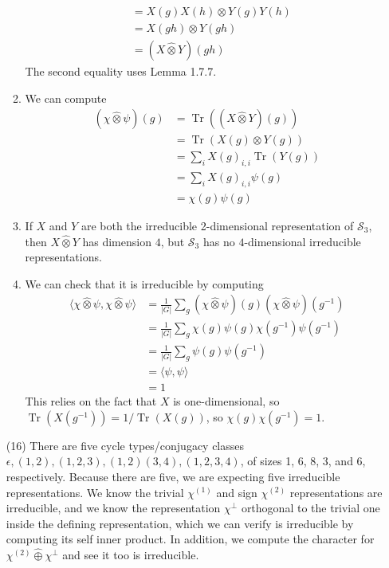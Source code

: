 \documentclass{amsart}
\DeclareMathOperator{\Tr}{Tr}
\renewcommand{\S}{\mathcal{S}}
\begin{document}
\begin{enumerate}
\begin{enumerate}
\begin{align*}
    &= X(g)X(h) \otimes Y(g)Y(h) \\
    & = X(gh) \otimes Y(gh) \\
    &= (X \hat{\otimes} Y)(gh)
    \end{align*}
    The second equality uses Lemma 1.7.7.
    \item We can compute
    \begin{align*}
        (\chi\hat{\otimes}\psi)(g) &= \Tr((X\hat{\otimes}Y)(g)) \\
                                   &= \Tr(X(g) \otimes Y(g)) \\
                                   &= \sum_{i}X(g)_{i,i}\Tr(Y(g)) \\
                                   &= \sum_iX(g)_{i,i} \psi(g) \\
                                   &= \chi(g)\psi(g)
    \end{align*}
    \item If $X$ and $Y$ are both the irreducible 2-dimensional representation of $\S_3$, then $X \hat{\otimes} Y$ has dimension $4$, but $\S_3$ has no $4$-dimensional irreducible representations.
    \item We can check that it is irreducible by computing
    \begin{align*}
        \langle \chi\hat{\otimes}\psi, \chi\hat{\otimes}\psi\rangle &=
         \frac{1}{|G|}\sum_g (\chi\hat{\otimes}\psi)(g) (\chi\hat{\otimes}\psi)(g^{-1}) \\
         &= \frac{1}{|G|}\sum_g \chi(g)\psi(g) \chi(g^{-1})\psi(g^{-1})\\
         &= \frac{1}{|G|}\sum_g \psi(g)\psi(g^{-1})\\
         &= \langle \psi, \psi \rangle \\
         &= 1
    \end{align*}
    This relies on the fact that $X$ is one-dimensional, so $\Tr(X(g^{-1})) = 1/\Tr(X(g))$, so $\chi(g)\chi(g^{-1}) = 1$.
    \end{enumerate}
    \item[(16)] There are five cycle types/conjugacy classes  $\epsilon, (1,2), (1,2,3), (1,2)(3,4), (1,2,3,4)$, of sizes 1, 6, 8, 3, and 6, respectively.
     Because there are five, we are expecting five irreducible representations.  We know the trivial $\chi^{(1)}$ and sign $\chi^{(2)}$ representations are irreducible, and we know the representation $\chi^{\perp}$ orthogonal to the trivial one inside the defining representation, which we can verify is irreducible by computing its self inner product.  In addition, we compute
     the character for $\chi^{(2)} \hat{\oplus} \chi^{\perp}$ and see it too
     is irreducible.


\end{enumerate}
\end{document}
